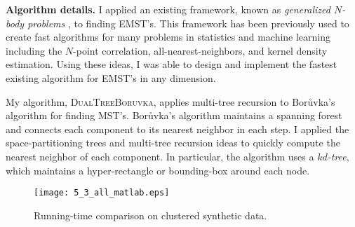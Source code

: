 \documentclass[twoside,leqno, 12pt]{article}
\begin{document}
%



\textbf{Algorithm details.}  I applied an existing framework, known as \emph{generalized $N$-body problems} \cite{gray_nbody}, to finding EMST's.  This framework has been previously used to create fast algorithms for many problems in statistics and machine learning including the $N$-point correlation, all-nearest-neighbors, and kernel density estimation.  Using these ideas, I was able to design and implement the fastest existing algorithm for EMST's in any dimension.  

My algorithm, \textsc{DualTreeBoruvka}, applies multi-tree recursion to Bor\r{u}vka's algorithm for finding MST's.  Bor\r{u}vka's algorithm maintains a spanning forest and connects each component to its nearest neighbor in each step.  I applied the space-partitioning trees and multi-tree recursion ideas to quickly compute the nearest neighbor of each component.  In particular, the algorithm uses a \emph{$kd$-tree}, which maintains a hyper-rectangle or bounding-box around each node.
 \begin{wrapfigure}{r}{0.45\textwidth}
\texttt{[image: 5\_3\_all\_matlab.eps]}
\caption{Running-time comparison on clustered synthetic data.}
\label{runtime}
\end{wrapfigure}

\end{document}
